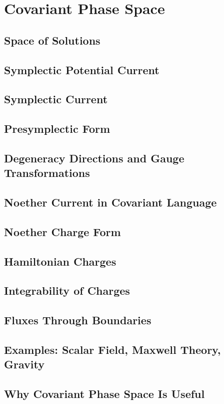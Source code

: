 \chapter{Covariant Phase Space}

\section{Space of Solutions}
\section{Symplectic Potential Current}
\section{Symplectic Current}
\section{Presymplectic Form}
\section{Degeneracy Directions and Gauge Transformations}
\section{Noether Current in Covariant Language}
\section{Noether Charge Form}
\section{Hamiltonian Charges}
\section{Integrability of Charges}
\section{Fluxes Through Boundaries}
\section{Examples: Scalar Field, Maxwell Theory, Gravity}
\section{Why Covariant Phase Space Is Useful}
